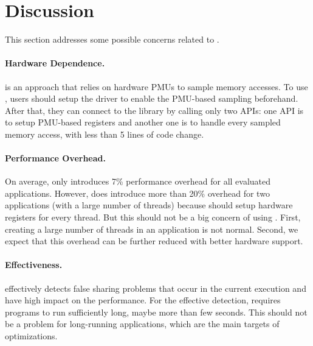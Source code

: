 \section{Discussion}

\label{sec:discuss}

This section addresses some possible concerns related to \Cheetah{}. 

\paragraph{Hardware Dependence.} \cheetah{} is an approach that relies on hardware PMUs to sample memory accesses. To use \cheetah{}, users should setup the driver to enable the PMU-based sampling beforehand. After that, they can connect to the \cheetah{} library by calling only two APIs: one API is to setup PMU-based registers and another one is to handle every sampled memory access, with less than 5 lines of code change. 

\paragraph{Performance Overhead.} On average, \Cheetah{} only introduces 7\% performance overhead for all evaluated applications. However, \cheetah{} does introduce more than 20\% overhead for two applications (with a large number of threads) because \cheetah{} should setup hardware registers for every thread. But this should not be a big concern of using \cheetah{}. First, creating a large number of threads in an application is not normal. Second, we expect that this overhead can be further reduced with better hardware support. 

\paragraph{Effectiveness.} \Cheetah{} effectively detects false sharing problems that occur in the current execution and have high impact on the performance. For the effective detection, \Cheetah{} requires programs to run sufficiently long, maybe more than few seconds. This should not be a problem for long-running applications, which are the main targets of optimizations. 
